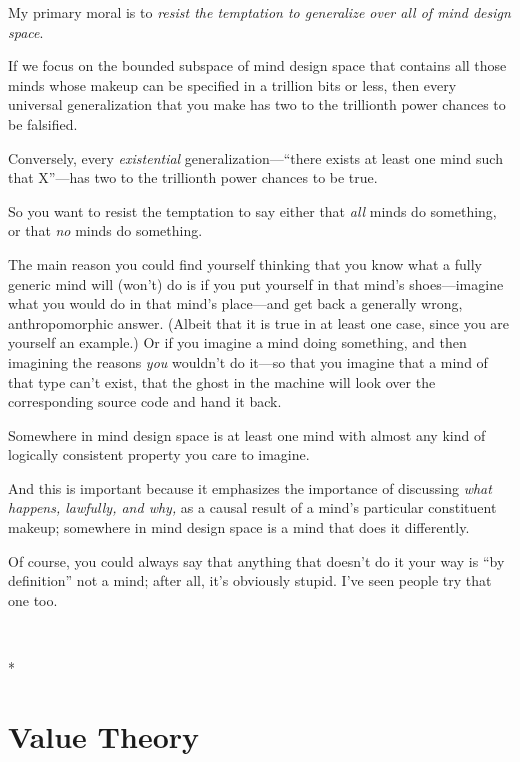 {
 My primary moral is to \textit{resist the temptation to generalize
over all of mind design space}.}

{
 If we focus on the bounded subspace of mind design space that
contains all those minds whose makeup can be specified in a trillion
bits or less, then every universal generalization that you make has two
to the trillionth power chances to be falsified.}

{
 Conversely, every \textit{existential}
generalization---``there exists at least one mind such
that X''---has two to the trillionth power chances to
be true.}

{
 So you want to resist the temptation to say either that
\textit{all} minds do something, or that \textit{no} minds do
something.}

{
 The main reason you could find yourself thinking that you know
what a fully generic mind will (won't) do is if you put
yourself in that mind's shoes---imagine what you would
do in that mind's place---and get back a generally
wrong, anthropomorphic answer. (Albeit that it is true in at least one
case, since you are yourself an example.) Or if you imagine a mind
doing something, and then imagining the reasons \textit{you}
wouldn't do it---so that you imagine that a mind of
that type can't exist, that the ghost in the machine
will look over the corresponding source code and hand it back.}

{
 Somewhere in mind design space is at least one mind with almost
any kind of logically consistent property you care to imagine.}

{
 And this is important because it emphasizes the importance of
discussing \textit{what happens, lawfully, and why,} as a causal result
of a mind's particular constituent makeup; somewhere in
mind design space is a mind that does it differently.}

{
 Of course, you could always say that anything that
doesn't do it your way is ``by
definition'' not a mind; after all,
it's obviously stupid. I've seen people
try that one too.}

{\centering
 \ ~
\par}

{\centering
 *
\par}

\chapter{Value Theory}


